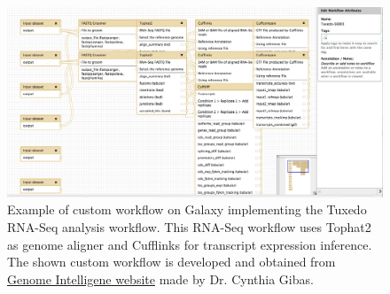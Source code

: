 \begin{figure}[!tb]
\centering
\includegraphics[width=1\textwidth]{images/galaxy_workflow}
\caption[Example of custom workflow on Galaxy]{
    Example of custom workflow on Galaxy implementing the Tuxedo RNA-Seq
    analysis workflow. This RNA-Seq workflow uses Tophat2 as genome aligner and
    Cufflinks for transcript expression inference. The shown custom workflow is
    developed and obtained from
        \href{http://genomeintelligence.org/?p=561}
        {Genome Intelligene website}
    made by Dr. Cynthia Gibas.
}
\label{fig:galaxy-workflow}
\end{figure}
